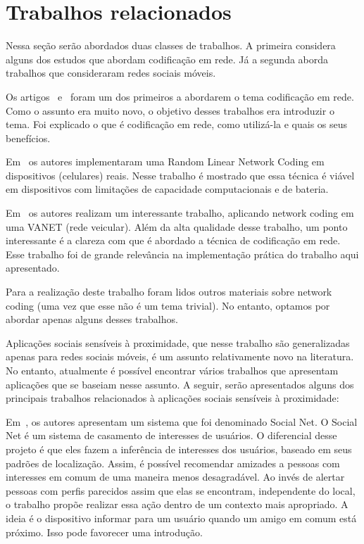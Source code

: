 \section{Trabalhos relacionados}
\label{sec:related-work}

Nessa seção serão abordados duas classes de trabalhos. A primeira
considera alguns dos estudos que abordam codificação em
rede. Já a segunda aborda trabalhos que consideraram redes sociais
móveis.

Os artigos~\cite{NWC_theory} e~\cite{citeulike:1401816} foram um dos
primeiros a abordarem o tema codificação em rede. Como o assunto era
muito novo, o objetivo desses trabalhos era introduzir o tema. Foi
explicado o que é codificação em rede, como utilizá-la e quais os seus
benefícios.

Em~\cite{pedersen09:_networ_codin_mobil_devic_system} os autores
implementaram uma Random Linear Network Coding em dispositivos
(celulares) reais. Nesse trabalho é mostrado que essa técnica é viável
em dispositivos com limitações de capacidade computacionais e de
bateria. 

Em~\cite{citeulike:1401840} os autores realizam um interessante
trabalho, aplicando network coding em uma VANET (rede veicular). Além da
alta qualidade desse trabalho, um ponto interessante é a clareza com que
é abordado a técnica de codificação em rede. Esse trabalho foi de grande
relevância na implementação prática do trabalho aqui apresentado.

Para a realização deste trabalho foram lidos outros materiais sobre
network coding (uma vez que esse não é um tema trivial). No entanto,
optamos por abordar apenas alguns desses trabalhos.

Aplicações sociais sensíveis à proximidade, que nesse trabalho
são generalizadas apenas para redes sociais móveis, é um assunto
relativamente novo na literatura. No entanto, atualmente é possível
encontrar vários trabalhos que apresentam aplicações que se baseiam
nesse assunto. A seguir, serão apresentados alguns dos principais
trabalhos
relacionados à aplicações sociais sensíveis à proximidade:

Em~\cite{SocialNet}, os autores
apresentam um sistema que foi denominado Social Net. O Social Net é um
sistema de casamento de interesses de usuários. O diferencial desse
projeto é que eles fazem a inferência de interesses dos usuários,
baseado em seus padrões de localização. Assim, é possível
recomendar amizades a pessoas com interesses em comum de uma maneira
menos desagradável. Ao invés de alertar pessoas com perfis parecidos
assim que elas se encontram, independente do local, o trabalho propõe
realizar essa ação dentro de um contexto mais apropriado. A ideia é o
dispositivo informar para um usuário quando um amigo em comum está
próximo. Isso pode favorecer uma introdução.


